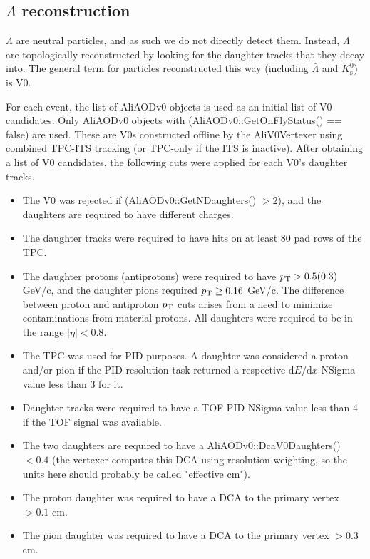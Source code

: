 \subsection{$\Lambda$ reconstruction}
\label{sec:Recon}

$\Lambda$ are neutral particles, and as such we do not directly detect them.  Instead, $\Lambda$ are topologically reconstructed by looking for the daughter tracks that they decay into.  The general term for particles reconstructed this way (including $\bar{\Lambda}$ and $K^0_\mathrm{s}$) is V0.

For each event, the list of AliAODv0 objects is used as an initial list of V0 candidates.  Only AliAODv0 objects with (AliAODv0::GetOnFlyStatus() == false) are used.  These are V0s constructed offline by the AliV0Vertexer using combined TPC-ITS tracking (or TPC-only if the ITS is inactive).  After obtaining a list of V0 candidates, the following cuts were applied for each V0's daughter tracks.

\begin{itemize}
\item The V0 was rejected if (AliAODv0::GetNDaughters() $> 2$), and the daughters are required to have different charges.
\item The daughter tracks were required to have hits on at least 80 pad rows of the TPC.
\item The daughter protons (antiprotons) were required to have $p_{\rm T} > 0.5 (0.3)$ GeV/c, and the daughter pions required $p_{\rm T} \geq 0.16$ GeV/c. The difference between proton and antiproton $p_{\rm T}$ cuts arises from a need to minimize contaminations from material protons. All daughters were required to be in the range $|\eta| < 0.8$.
\item The TPC was used for PID purposes.  A daughter was considered a proton and/or pion if the PID resolution task returned a respective $\mathrm{d}E/\mathrm{d}x$ NSigma value less than 3 for it.
\item Daughter tracks were required to have a TOF PID NSigma value less than 4 if the TOF signal was available.
\item The two daughters are required to have a AliAODv0::DcaV0Daughters() $< 0.4$ (the vertexer computes this DCA using resolution weighting, so the units here should probably be called "effective cm").
\item The proton daughter was required to have a DCA to the primary vertex $> 0.1$ cm.
\item The pion daughter was required to have a DCA to the primary vertex $> 0.3$ cm.
\end{itemize}

